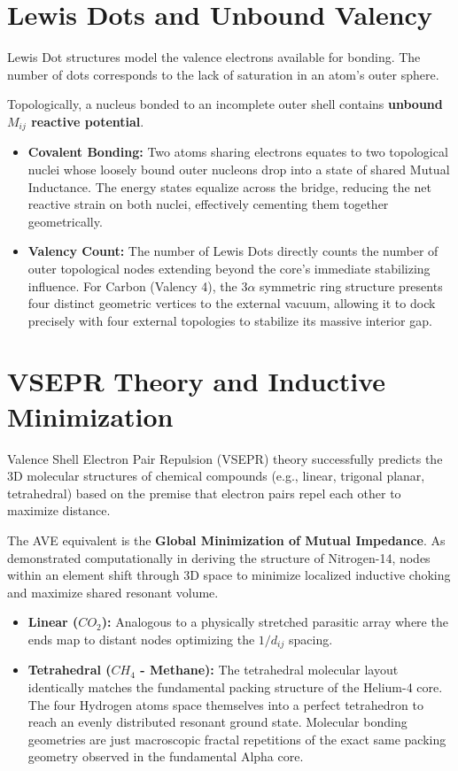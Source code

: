 \section{Lewis Dots and Unbound Valency}
Lewis Dot structures model the valence electrons available for bonding. The number of dots corresponds to the lack of saturation in an atom's outer sphere.

Topologically, a nucleus bonded to an incomplete outer shell contains \textbf{unbound $M_{ij}$ reactive potential}. 
\begin{itemize}
    \item \textbf{Covalent Bonding:} Two atoms sharing electrons equates to two topological nuclei whose loosely bound outer nucleons drop into a state of shared Mutual Inductance. The energy states equalize across the bridge, reducing the net reactive strain on both nuclei, effectively cementing them together geometrically.
    \item \textbf{Valency Count:} The number of Lewis Dots directly counts the number of outer topological nodes extending beyond the core's immediate stabilizing influence. For Carbon (Valency 4), the $3\alpha$ symmetric ring structure presents four distinct geometric vertices to the external vacuum, allowing it to dock precisely with four external topologies to stabilize its massive interior gap.
\end{itemize}

\section{VSEPR Theory and Inductive Minimization}
Valence Shell Electron Pair Repulsion (VSEPR) theory successfully predicts the 3D molecular structures of chemical compounds (e.g., linear, trigonal planar, tetrahedral) based on the premise that electron pairs repel each other to maximize distance.

The AVE equivalent is the \textbf{Global Minimization of Mutual Impedance}. As demonstrated computationally in deriving the structure of Nitrogen-14, nodes within an element shift through 3D space to minimize localized inductive choking and maximize shared resonant volume.

\begin{itemize}
    \item \textbf{Linear ($CO_2$):} Analogous to a physically stretched parasitic array where the ends map to distant nodes optimizing the $1/d_{ij}$ spacing.
    \item \textbf{Tetrahedral ($CH_4$ - Methane):} The tetrahedral molecular layout identically matches the fundamental packing structure of the Helium-4 core. The four Hydrogen atoms space themselves into a perfect tetrahedron to reach an evenly distributed resonant ground state. Molecular bonding geometries are just macroscopic fractal repetitions of the exact same packing geometry observed in the fundamental Alpha core.
\end{itemize}

